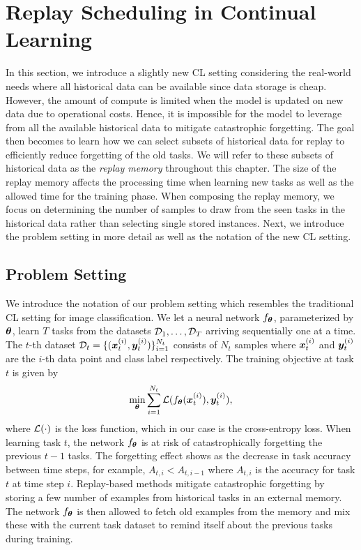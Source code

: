\section{Replay Scheduling in Continual Learning}\label{sec:replay_scheduling_in_cl}

In this section, we introduce a slightly new CL setting considering the real-world needs where all historical data can be available since data storage is cheap. However, the amount of compute is limited when the model is updated on new data due to operational costs. Hence, it is impossible for the model to leverage from all the available historical data to mitigate catastrophic forgetting. The goal then becomes to learn how we can select subsets of historical data for replay to efficiently reduce forgetting of the old tasks. We will refer to these subsets of historical data as the \textit{replay memory} throughout this chapter. The size of the replay memory affects the processing time when learning new tasks as well as the allowed time for the training phase. When composing the replay memory, we focus on determining the number of samples to draw from the seen tasks in the historical data rather than selecting single stored instances. Next, we introduce the problem setting in more detail as well as the notation of the new CL setting. 


\subsection{Problem Setting}

We introduce the notation of our problem setting which resembles the traditional CL setting for image classification. We let a neural network $f_{{\bm{\theta}}}$, parameterized by ${\bm{\theta}}$, learn $T$ tasks from the datasets ${\mathcal{D}}_1, \dots, {\mathcal{D}}_T$ arriving sequentially one at a time. The $t$-th dataset ${\mathcal{D}}_t = \{({\bm{x}}_{t}^{(i)}, {\bm{y}}_{t}^{(i)})\}_{i=1}^{N_{t}}$ consists of $N_t$ samples where ${\bm{x}}_{t}^{(i)}$ and ${\bm{y}}_{t}^{(i)}$ are the $i$-th data point and class label respectively. The training objective at task $t$ is given by 
\vspace{-2mm}
\begin{align}
	\underset{{\bm{\theta}}}{\text{min}} \sum_{i=1}^{N_t} {\mathcal{L}}(f_{{\bm{\theta}}}({\bm{x}}_t^{(i)}), {\bm{y}}_{t}^{(i)}),
\end{align}
where ${\mathcal{L}}(\cdot)$ is the loss function, which in our case is the cross-entropy loss.  
When learning task $t$, the network $f_{{\bm{\theta}}}$ is at risk of catastrophically forgetting the previous $t-1$ tasks. The forgetting effect shows as the decrease in task accuracy between time steps, for example, $A_{t, i} < A_{t, i-1}$ where $A_{t, i}$ is the accuracy for task $t$ at time step $i$. Replay-based methods mitigate catastrophic forgetting by storing a few number of examples from historical tasks in an external memory. The network $f_{{\bm{\theta}}}$ is then allowed to fetch old examples from the memory and mix these with the current task dataset to remind itself about the previous tasks during training. 


